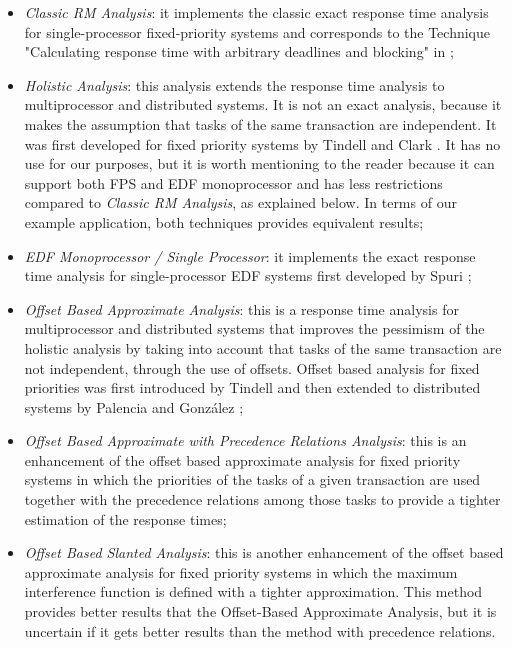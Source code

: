 \documentclass{article}
\begin{document}
\begin{itemize}
   \item \textit{Classic RM Analysis}: it implements the classic exact response time analysis for single-processor fixed-priority systems and corresponds to the Technique "Calculating response time with arbitrary deadlines and blocking" in \cite{practitioner};
   \item \textit{Holistic Analysis}: this analysis extends the response time analysis to multiprocessor and distributed systems. It is not an exact analysis, because it makes the assumption that tasks of the same transaction are independent. It was first developed for fixed priority systems by Tindell and Clark \cite{holistic-analysis}. It has no use for our purposes, but it is worth mentioning to the reader because it can support both FPS and EDF monoprocessor and has less restrictions compared to \textit{Classic RM Analysis}, as explained below. In terms of our example application, both techniques provides equivalent results;
   \item \textit{EDF Monoprocessor / Single Processor}: it implements the exact response time analysis for single-processor EDF systems first developed by Spuri \cite{spuri};
   \item \textit{Offset Based Approximate Analysis}: this is a response time analysis for multiprocessor and distributed systems that improves the pessimism of the holistic analysis by taking into account that tasks of the same transaction are not independent, through the use of offsets. Offset based analysis for fixed priorities was first introduced by Tindell \cite{tindell-offsets} and then extended to distributed systems by Palencia and González \cite{pessimistic-rma};
   \item \textit{Offset Based Approximate with Precedence Relations Analysis}: this is an enhancement of the offset based approximate analysis for fixed priority systems in which the priorities of the tasks of a given transaction are used together with the precedence relations among those tasks to provide a tighter estimation of the response times;
   \item \textit{Offset Based Slanted Analysis}: this is another enhancement of the offset based approximate analysis for fixed priority systems in which the maximum interference function is defined with a tighter approximation. This method provides better results that the Offset-Based Approximate Analysis, but it is uncertain if it gets better results than the method with precedence relations.
\end{itemize}
\end{document}
